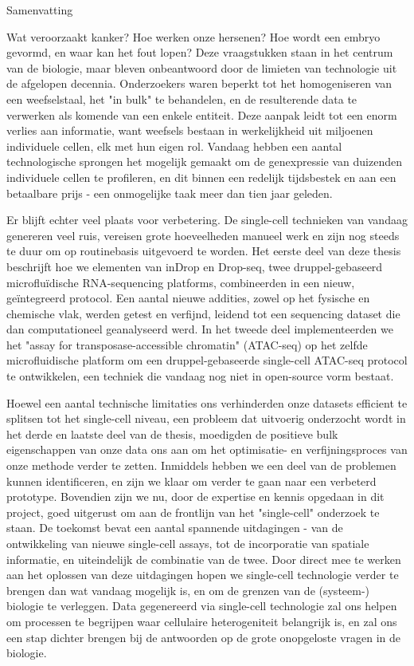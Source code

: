 \clearpage
{\Huge\mdseries\raggedright Samenvatting}\pms
\bigskip
\bigskip

Wat veroorzaakt kanker? Hoe werken onze hersenen? Hoe wordt een embryo gevormd, en waar kan het fout lopen? Deze vraagstukken staan in het centrum van de biologie, maar bleven onbeantwoord door de limieten van technologie uit de afgelopen decennia. Onderzoekers waren beperkt tot het homogeniseren van een weefselstaal, het "in bulk" te behandelen, en de resulterende data te verwerken als komende van een enkele entiteit. Deze aanpak leidt tot een enorm verlies aan informatie, want weefsels bestaan in werkelijkheid uit miljoenen individuele cellen, elk met hun eigen rol. Vandaag hebben een aantal technologische sprongen het mogelijk gemaakt om de genexpressie van duizenden individuele cellen te profileren, en dit binnen een redelijk tijdsbestek en aan een betaalbare prijs - een onmogelijke taak meer dan tien jaar geleden.\pms

Er blijft echter veel plaats voor verbetering. De single-cell technieken van vandaag genereren veel ruis, vereisen grote hoeveelheden manueel werk en zijn nog steeds te duur om op routinebasis uitgevoerd te worden. Het eerste deel van deze thesis beschrijft hoe we elementen van inDrop en Drop-seq, twee druppel-gebaseerd microflu\"idische RNA-sequencing platforms, combineerden in een nieuw, ge\"integreerd protocol. Een aantal nieuwe addities, zowel op het fysische en chemische vlak, werden getest en verfijnd, leidend tot een sequencing dataset die dan computationeel geanalyseerd werd. In het tweede deel implementeerden we het "assay for transposase-accessible chromatin" (ATAC-seq) op het zelfde microfluidische platform om een druppel-gebaseerde single-cell ATAC-seq protocol te ontwikkelen, een techniek die vandaag nog niet in open-source vorm bestaat.\pms

Hoewel een aantal technische limitaties ons verhinderden onze datasets efficient te splitsen tot het single-cell niveau, een probleem dat uitvoerig onderzocht wordt in het derde en laatste deel van de thesis, moedigden de positieve bulk eigenschappen van onze data ons aan om het optimisatie- en verfijningsproces van onze methode verder te zetten. Inmiddels hebben we een deel van de problemen kunnen identificeren, en zijn we klaar om verder te gaan naar een verbeterd prototype. Bovendien zijn we nu, door de expertise en kennis opgedaan in dit project, goed uitgerust om aan de frontlijn van het "single-cell" onderzoek te staan. De toekomst bevat een aantal spannende uitdagingen - van de ontwikkeling van nieuwe single-cell assays, tot de incorporatie van spatiale informatie, en uiteindelijk de combinatie van de twee. Door direct mee te werken aan het oplossen van deze uitdagingen hopen we single-cell technologie verder te brengen dan wat vandaag mogelijk is, en om de grenzen van de (systeem-) biologie te verleggen. Data gegenereerd via single-cell technologie zal ons helpen om processen te begrijpen waar cellulaire heterogeniteit belangrijk is, en zal ons een stap dichter brengen bij de antwoorden op de grote onopgeloste vragen in de biologie.
\pms
